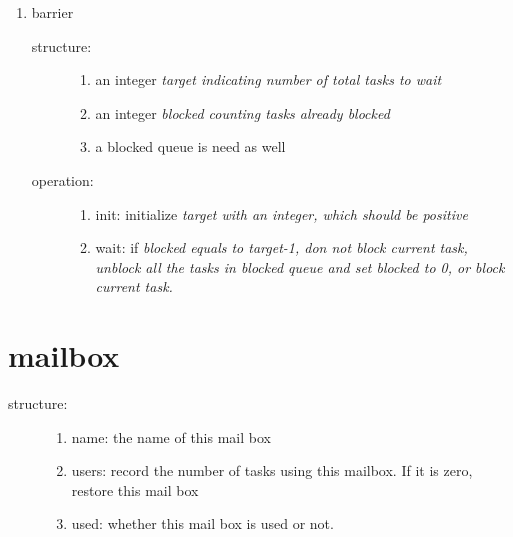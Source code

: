 \documentclass{article}
\begin{document}
\begin{enumerate}
\begin{description}
\begin{enumerate}
    \end{enumerate}
  \end{description}
\item barrier
  \begin{description}
  \item[structure:]
    \begin{enumerate}
      \item an integer \em target \em indicating number of total tasks to wait
      \item an integer \em blocked \em counting tasks already blocked
        \item a blocked queue is need as well
    \end{enumerate}
  \end{description}
    \begin{description}
  \item[operation:]
    \begin{enumerate}
      \item init: initialize \em target \em with an integer, which should be positive
      \item wait: if \em blocked \em equals to \em target-1\em, don not block current task,  unblock all the tasks in blocked queue and set \em blocked \em to 0, or block current task.
    \end{enumerate}
  \end{description}
\end{enumerate}
\section{mailbox}
\begin{description}
\item[structure:]
  \begin{enumerate}
  \item name: the name of this mail box
  \item users: record the number of tasks using this mailbox. If it is zero, restore this mail box
    \item used: whether this mail box is used or not.
  \end{enumerate}
\end{description}
\end{document}
